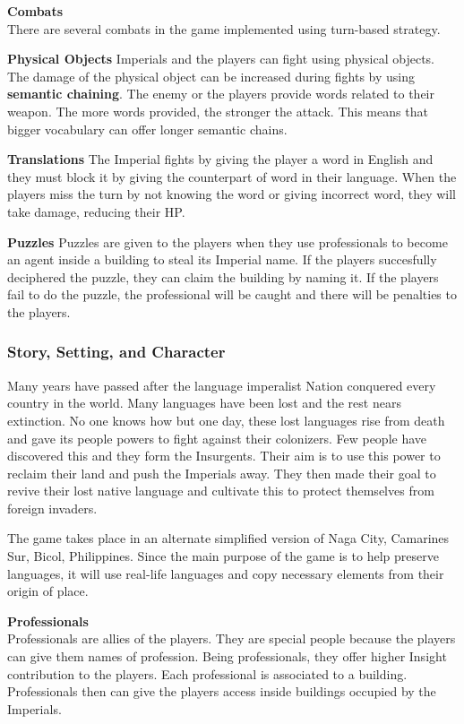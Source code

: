 \documentclass[11pt]{article}
\begin{document}
\textbf{Combats}\\
There are several combats in the game implemented using turn-based strategy.

\textbf{Physical Objects}
Imperials and the players can fight using physical objects. The damage of the physical object can be increased during fights by using \textbf{semantic chaining}. The enemy or the players provide words related to their weapon. The more words provided, the stronger the attack. This means that bigger vocabulary can offer longer semantic chains.

\textbf{Translations}
The Imperial fights by giving the player a word in English and they must block it by giving the counterpart of word in their language. When the players miss the turn by not knowing the word or giving incorrect word, they will take damage, reducing their HP.

\textbf{Puzzles}
Puzzles are given to the players when they use professionals to become an agent inside a building to steal its Imperial name. If the players succesfully deciphered the puzzle, they can claim the building by naming it. If the players fail to do the puzzle, the professional will be caught and there will be penalties to the players. 




\subsubsection{Story, Setting, and Character}
Many years have passed after the language imperalist Nation conquered every country in the world. Many languages have been lost and the rest nears extinction. No one knows how but one day, these lost languages rise from death and gave its people powers to fight against their colonizers. Few people have discovered this and they form the Insurgents. Their aim is to use this power to reclaim their land and push the Imperials away. They then made their goal to revive their lost native language and cultivate this to protect themselves from foreign invaders. 

The game takes place in an alternate simplified version of Naga City, Camarines Sur, Bicol, Philippines. Since the main purpose of the game is to help preserve languages, it will use real-life languages and copy necessary elements from their origin of place.

\textbf{Professionals} \\
Professionals are allies of the players. They are special people because the players can give them names of profession. Being professionals, they offer higher Insight contribution to the players. Each professional is associated to a building. Professionals then can give the players access inside buildings occupied by the Imperials.
\end{document}
